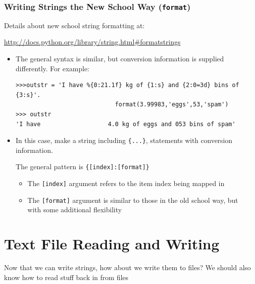 \documentclass{beamer}
\newcommand\Fontvi{\fontsize{8.5}{7.2}\selectfont}
\begin{document}
\begin{frame}[fragile]
\frametitle{Writing Strings the New School Way (\texttt{format})}
Details about new school string formatting at:\newline{}
\begin{small}
\Fontvi
\url{http://docs.python.org/library/string.html#formatstrings}
\end{small}
\begin{itemize}
\item The general syntax is similar, but conversion information is supplied differently. For example:
\begin{lstlisting}
>>>outstr = 'I have %{0:21.1f} kg of {1:s} and {2:0=3d} bins of {3:s}'.
							format(3.99983,'eggs',53,'spam')
>>> outstr
'I have                   4.0 kg of eggs and 053 bins of spam'
\end{lstlisting}
\item In this case, make a string including \texttt{\{...\}}, statements with conversion information.

The general pattern is \texttt{\{[index]:[format]\}}\newline{}
\begin{itemize}
\item The \texttt{[index]} argument refers to the item index being mapped in\newline{}
\item The \texttt{[format]} argument is similar to those in the old school way, but with some additional flexibility
\end{itemize}

\end{itemize}
\end{frame}
\section{Text File Reading and Writing}
\begin{frame}[fragile]
Now that we can write strings, how about we write them to files? \newline{}
We should also know how to read stuff back in from files
\end{frame}
\end{document}
